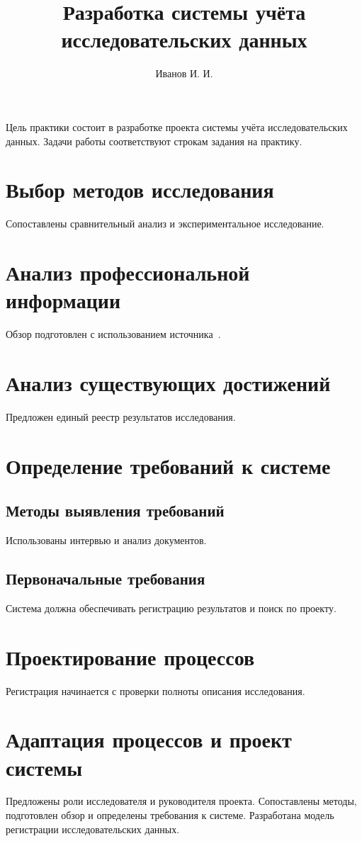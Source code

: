 \documentclass{tex2sto}
\title{Разработка системы учёта исследовательских данных}
\author{Иванов И. И.}
\institute{Институт информатики и кибернетики}
\begin{document}
\introduction
Цель практики состоит в разработке проекта системы учёта исследовательских данных.
Задачи работы соответствуют строкам задания на практику.
\section{Выбор методов исследования}
Сопоставлены сравнительный анализ и экспериментальное исследование.
\section{Анализ профессиональной информации}
Обзор подготовлен с использованием источника~\cite{guide}.
\section{Анализ существующих достижений}
Предложен единый реестр результатов исследования.
\section{Определение требований к системе}
\subsection{Методы выявления требований}
Использованы интервью и анализ документов.
\subsection{Первоначальные требования}
Система должна обеспечивать регистрацию результатов и поиск по проекту.
\section{Проектирование процессов}
Регистрация начинается с проверки полноты описания исследования.
\section{Адаптация процессов и проект системы}
Предложены роли исследователя и руководителя проекта.
\conclusion
Сопоставлены методы, подготовлен обзор и определены требования к системе.
Разработана модель регистрации исследовательских данных.
{}
\printbibliography
\end{document}
